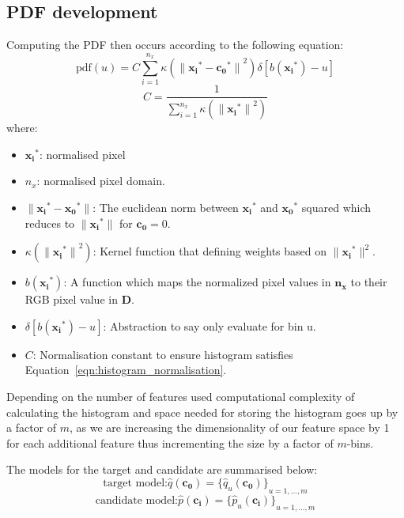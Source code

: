 \subsection{PDF development}
Computing the PDF then occurs according to the following equation:
\begin{equation}\label{eqn:mean_shift_histogram}
    \text{pdf}(u)=C\sum_{i=1}^{n_x}\kappa({\parallel{\mathbf{x_i}^*}-{\mathbf{c_0}^*}\parallel}^2)\delta[b(\mathbf{x_i}^*)-u]    
\end{equation}
\begin{equation}\label{eqn:histogram_normalisation}
    C=\frac{1}{\sum_{i=1}^{n_x}\kappa({\parallel\mathbf{x_i}^*\parallel}^2)}
\end{equation}
where:
\begin{itemize}
    \item $\mathbf{x_i}^*$: normalised pixel 
    \item $n_x$: normalised pixel domain.
    \item $\parallel{\mathbf{x_i}}^*-{\mathbf{x_0}}^*\parallel$: The euclidean
        norm between $\mathbf{x_i}^*$ and ${\mathbf{x_0}}^*$ squared which
        reduces to $\parallel{\mathbf{x_i}}^*\parallel$ for $\mathbf{c_0} = 0$. 
    \item $\kappa({\parallel{\mathbf{x_i}}^*\parallel}^2)$: Kernel function that
        defining weights based on $\parallel{\mathbf{x_i}}^*\parallel^2$.
    \item $b({\mathbf{x_i}}^*)$: A function which maps the normalized pixel
        values in $\mathbf{n_x}$ to their RGB pixel value in $\mathbf{D}$.
    \item $\delta[b({\mathbf{x_i}}^*)-u]$: Abstraction to say only evaluate for bin u.
    \item $C$: Normalisation constant to ensure histogram satisfies Equation~\ref{eqn:histogram_normalisation}.
\end{itemize}

Depending on the number of features used computational complexity of calculating
the histogram and space needed for storing the histogram goes up by a factor of
$m$, as we are increasing the dimensionality of our feature space by 1 for each
additional feature thus incrementing the size by a factor of $m$-bins.

The models for the target and candidate are summarised below:
\[\text{target model:}\hat{q}(\mathbf{c_0}) = {\{\hat{q}_u(\mathbf{c_0})\}}_{u=1,\ldots,m}\]
\[\text{candidate model:}\hat{p}(\mathbf{c_i}) = {\{\hat{p}_u(\mathbf{c_i})\}}_{u=1,\ldots,m}\]

